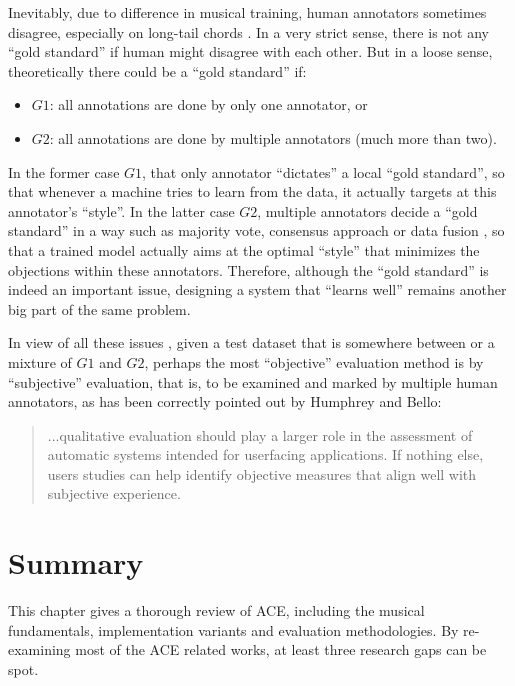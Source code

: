Inevitably, due to difference in musical training, human annotators sometimes disagree, especially on long-tail chords \cite{humphreyfour}. In a very strict sense, there is not any ``gold standard'' if human might disagree with each other. But in a loose sense, theoretically there could be a ``gold standard'' if:
\begin{itemize}
\item $G1$: all annotations are done by only one annotator, or
\item $G2$: all annotations are done by multiple annotators (much more than two).
\end{itemize}
In the former case $G1$, that only annotator ``dictates'' a local ``gold standard'', so that whenever a machine tries to learn from the data, it actually targets at this annotator's ``style''. In the latter case $G2$, multiple annotators decide a ``gold standard'' in a way such as majority vote, consensus approach \cite{ni2013understanding} or data fusion \cite{koopsintegration,klein2004sensor}, so that a trained model actually aims at the optimal ``style'' that minimizes the objections within these annotators. Therefore, although the ``gold standard'' is indeed an important issue, designing a system that ``learns well'' remains another big part of the same problem.

In view of all these issues \cite{humphreyfour,ni2013understanding}, given a test dataset that is somewhere between or a mixture of $G1$ and $G2$, perhaps the most ``objective'' evaluation method is by ``subjective'' evaluation, that is, to be examined and marked by multiple human annotators, as has been correctly pointed out by Humphrey and Bello:
\begin{quote}
...qualitative evaluation should play a larger role in the assessment of automatic systems intended for userfacing applications. If nothing else, users studies can help identify objective measures that align well with subjective experience.
\end{quote}

\section{Summary} \label{sec:2-summary}
This chapter gives a thorough review of ACE, including the musical fundamentals, implementation variants and evaluation methodologies. By re-examining most of the ACE related works, at least three research gaps can be spot.

